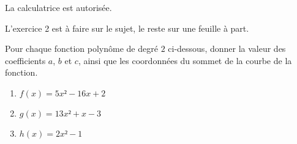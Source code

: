 \documentclass[
	classe=$1^{ere}STI2D$,
	headerTitle=Évaluation\space Chapitre\space 4
]{évaluation}
\begin{document}
\begin{tcolorbox}
	La calculatrice est autorisée.

	L'exercice 2 est à faire sur le sujet, le reste sur une feuille à part.
\end{tcolorbox}

\begin{exercice}
	Pour chaque fonction polynôme de degré $2$ ci-dessous, donner la valeur des coefficients $a$, $b$ et $c$, ainsi que les coordonnées du sommet de la courbe de la fonction.
	\begin{enumerate}
		\item $f(x) = 5x² - 16x + 2$
		\item $g(x) = 13x² + x - 3$
		\item $h(x) = 2x² - 1$
	\end{enumerate}
\end{exercice}
\end{document}
